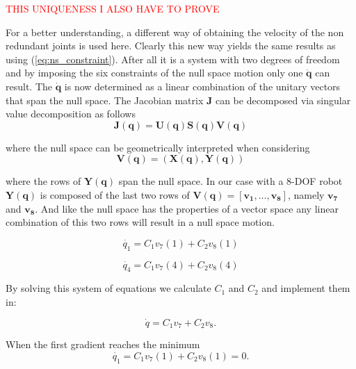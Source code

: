 \textcolor{red}{THIS UNIQUENESS I ALSO HAVE TO PROVE }

For a better understanding, a different way of obtaining the velocity of the non redundant joints is used here. Clearly this new way yields the same results as using  (\ref{eq:ns_constraint}). After all it is a system with two degrees of freedom and by imposing the six constraints of the null space motion only one $\mathbf{\dot{q}}$ can result.
The $\dot{\mathbf{q}}$ is now determined as a linear combination of the unitary vectors that span the null space.
The Jacobian matrix $\mathbf{J}$ can be decomposed via singular value decomposition \cite{svd} as follows
\begin{equation}
\mathbf{J}(\mathbf{q})=\mathbf{U}(\mathbf{q}) \mathbf{S}(\mathbf{q}) \mathbf{V}(\mathbf{q})
\label{eq:svd}
\end{equation}

where the null space can be geometrically interpreted when considering 
\begin{equation}
\mathbf{V}(\mathbf{q})=(\mathbf{X}(\mathbf{q}),\mathbf{Y}(\mathbf{q}))
\label{eq:4.32Dietrich}
\end{equation}

where the rows of $\mathbf{Y}(\mathbf{q})$ span the null space. In our case with a 8-DOF robot $\mathbf{Y}(\mathbf{q})$  is composed of the last two rows of $\mathbf{V}(\mathbf{q}) = [ \mathbf{v_1}, \dots , \mathbf{v_8}]$, namely $\mathbf{v_7}$ and $\mathbf{v_8}$. And like the null space has the properties of a vector space any linear combination of this two rows will result in a null space motion. 

\begin{equation}
\dot{q_1}  = C_1 v_7(1) + C_2 v_8(1) 
\label{eq:}
\end{equation}

\begin{equation}
\dot{q_4} = C_1 v_7(4) + C_2 v_8(4)
\label{eq:}
\end{equation}



By solving this system of equations we calculate $C_1$ and $C_2$ and implement them in:

\begin{equation}
\dot{q} = C_1 v_7 + C_2 v_8 .
\label{eq:}
\end{equation}

When the first gradient reaches the minimum \begin{equation}
\dot{q_1}  = C_1 v_7(1) + C_2 v_8(1) = 0 .
\label{eq:}
\end{equation}

